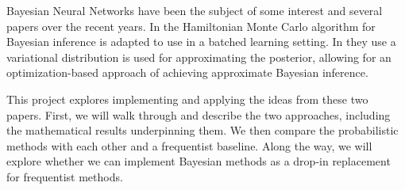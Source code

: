 Bayesian Neural Networks have been the subject of some interest and several papers over the recent years. 
In \autocite{chen_stochastic_2014} the Hamiltonian Monte Carlo algorithm for Bayesian inference is adapted to use in a batched learning setting. 
In \autocite{blundell_weight_2015} they use a variational distribution is used for approximating the posterior, allowing for an optimization-based approach of achieving approximate Bayesian inference.

This project explores implementing and applying the ideas from these two papers.
First, we will walk through and describe the two approaches, including the mathematical results underpinning them.
We then compare the probabilistic methods with each other and a frequentist baseline.
Along the way, we will explore whether we can implement Bayesian methods as a drop-in replacement for frequentist methods.